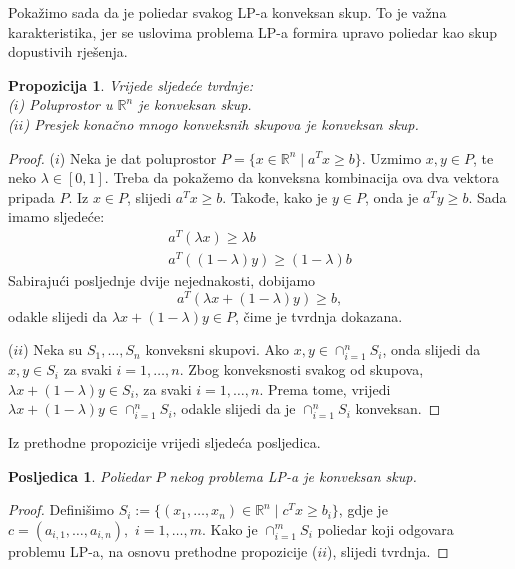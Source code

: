 \documentclass[a4paper, utf8, 11pt, colorlinks]{book}
\newtheorem{prop}{Propozicija}[chapter]
\newtheorem{poslje}{Posljedica}[chapter]
\theoremstyle{definition}
\begin{document}
Pokažimo sada da je poliedar svakog LP-a konveksan skup. To je važna karakteristika, jer se uslovima problema LP-a formira upravo poliedar kao skup dopustivih rješenja.


\begin{prop} Vrijede sljedeće tvrdnje: \\
  ($i$)  Poluprostor u $\mathbb{R}^n$ je konveksan skup.  \\
  ($ii$) Presjek konačno mnogo konveksnih skupova je konveksan skup. 
\end{prop}

\begin{proof}
  ($i$) Neka je dat poluprostor $P = \{ x \in \mathbb{R}^n \mid a^T x \geq b \}$. Uzmimo $x, y \in P$, te neko $\lambda \in [0, 1]$. Treba da pokažemo da konveksna kombinacija ova dva vektora   pripada $P$. Iz $x \in P$, slijedi  $a^T x \geq b$. Takođe, kako je $y \in P$, onda  je  $a^T y \geq b$. 
  Sada  imamo sljedeće:
  \begin{align}
      a^T (\lambda x) \geq \lambda b \\
      a^T ((1-\lambda) y) \geq (1-\lambda) b 
  \end{align}
  Sabirajući posljednje dvije nejednakosti, dobijamo 
  \begin{equation}
      a^T( \lambda x + (1 - \lambda) y ) \geq b,
  \end{equation}
  odakle slijedi da $\lambda x + (1-\lambda) y \in P$, čime je tvrdnja dokazana.
  
  ($ii$) Neka su $S_1,\ldots, S_n$ konveksni skupovi. Ako $x,y \in \cap_{i=1}^n S_i$, onda slijedi da $x,y \in S_i$ za svaki $i=1,\ldots,n$. Zbog konveksnosti svakog od skupova,  
  $\lambda x + (1 - \lambda) y \in S_i$, za svaki $i=1,\ldots,n$. Prema tome, vrijedi $ \lambda x + (1-\lambda) y \in \cap_{i=1}^n S_i$, odakle slijedi da je $\cap_{i=1}^n S_i$ konveksan. 
\end{proof}

Iz prethodne propozicije vrijedi sljedeća posljedica.

\begin{poslje}
Poliedar $P$ nekog problema LP-a je konveksan skup.	
\end{poslje}
 
 \begin{proof}
   Definišimo $S_i:= \{(x_1,\ldots, x_n) \in \mathbb{R}^n \mid c^T x \geq b_i \}$, gdje je  $c = (a_{i,1}, \ldots, a_{i, n}),$  $ i=1,\ldots, m$. Kako je $\cap_{i=1}^m S_i$ poliedar koji odgovara problemu LP-a, na osnovu prethodne propozicije ($ii$), slijedi tvrdnja. 
 \end{proof}
\end{document}
